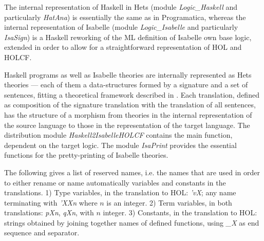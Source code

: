 \documentclass[a4paper,12pt]{article}
\begin{document}

The internal representation of Haskell in Hets (module
\emph{Logic\_Haskell} and particularly \emph{HatAna}) is essentially
the same as in Programatica, whereas the internal representation of
Isabelle (module \emph{Logic\_Isabelle} and particularly
\emph{IsaSign}) is a Haskell reworking of the ML definition of
Isabelle own base logic, extended in order to allow for a
straightforward representation of HOL and HOLCF.

Haskell programs as well as Isabelle theories are internally
represented as Hets theories --- each of them a data-structures formed
by a signature and a set of sentences, fitting a theoretical framework
described in \cite{MossaTh}.  Each translation, defined as composition
of the signature translation with the translation of all sentences,
has the structure of a morphism from theories in the internal
representation of the source language to those in the representation
of the target language.  The distribution module
\emph{Haskell2IsabelleHOLCF} contains the main function, dependent on
the target logic. The module \emph{IsaPrint} provides the essential
functions for the pretty-printing of Isabelle theories.

The following gives a list of reserved names, i.e. the names that are
used in order to either rename or name automatically variables and
constants in the translations.  1) Type variables, in the translation
to HOL: \emph{'vX}; any name terminating with \emph{'XXn} where $n$ is
an integer.  2) Term variables, in both translations: \emph{pXn},
\emph{qXn}, with $n$ integer. 3) Constants, in the translation to HOL:
strings obtained by joining together names of defined functions, using
\emph{\_X} as end sequence and separator.

\end{document}
